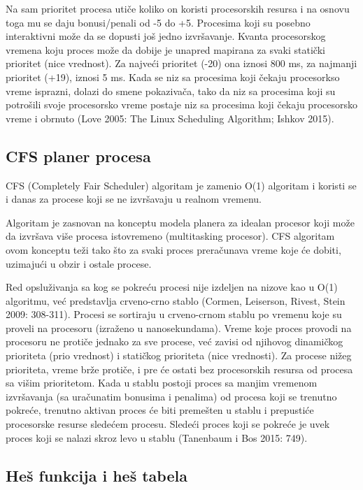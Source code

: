 Na sam prioritet procesa utiče koliko on koristi procesorskih resursa i na osnovu toga mu se daju bonusi/penali od -5 do +5. Procesima koji su posebno interaktivni može da se dopusti još jedno izvršavanje. Kvanta procesorskog vremena koju proces može da dobije je unapred mapirana za svaki statički prioritet (nice vrednost). Za najveći prioritet (-20) ona iznosi 800 ms, za najmanji prioritet (+19), iznosi 5 ms. Kada se niz sa procesima koji čekaju procesorkso vreme isprazni, dolazi do smene pokazivača, tako da niz sa procesima koji su potrošili svoje procesorsko vreme postaje niz sa procesima koji čekaju procesorsko vreme i obrnuto (Love 2005: The Linux Scheduling Algorithm; Ishkov 2015).

\subsection{CFS planer procesa}

CFS (Completely Fair Scheduler) algoritam je zamenio O(1) algoritam i koristi se i danas za procese koji se ne izvršavaju u realnom vremenu.

Algoritam je zasnovan na konceptu modela planera za idealan procesor koji može da izvršava više procesa istovremeno (multitasking procesor). CFS algoritam ovom konceptu teži tako što za svaki proces preračunava vreme koje će dobiti, uzimajući u obzir i ostale procese.

Red opsluživanja sa kog se pokreću procesi nije izdeljen na nizove kao u O(1) algoritmu, već predstavlja crveno-crno stablo (Cormen, Leiserson, Rivest, Stein 2009: 308-311). Procesi se sortiraju u crveno-crnom stablu po vremenu koje su proveli na procesoru (izraženo u nanosekundama). Vreme koje proces provodi na procesoru ne protiče jednako za sve procese, već zavisi od njihovog dinamičkog prioriteta (prio vrednost) i statičkog prioriteta (nice vrednosti). Za procese nižeg prioriteta, vreme brže protiče, i pre će ostati bez procesorskih resursa od procesa sa višim prioritetom. Kada u stablu postoji proces sa manjim vremenom izvršavanja (sa uračunatim bonusima i penalima) od procesa koji se trenutno pokreće, trenutno aktivan proces će biti premešten u stablu i prepustiće procesorske resurse sledećem procesu. Sledeći proces koji se pokreće je uvek proces koji se nalazi skroz levo u stablu (Tanenbaum i Bos 2015: 749).

\subsection{Heš funkcija i heš tabela}

